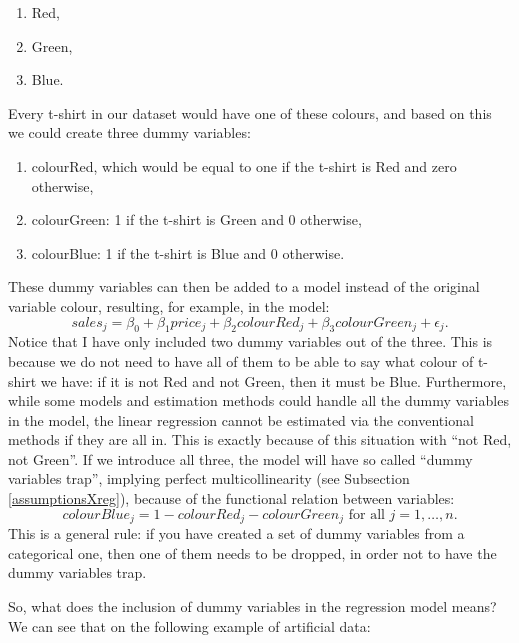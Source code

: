 \documentclass[
]{book}
\providecommand{\tightlist}{%
  \setlength{\itemsep}{0pt}\setlength{\parskip}{0pt}}
\theoremstyle{definition}
\theoremstyle{definition}
\theoremstyle{definition}
\theoremstyle{definition}
\theoremstyle{remark}
\begin{document}
\begin{enumerate}
\def\labelenumi{\arabic{enumi}.}
\tightlist
\item
  Red,
\item
  Green,
\item
  Blue.
\end{enumerate}

Every t-shirt in our dataset would have one of these colours, and based on this we could create three dummy variables:

\begin{enumerate}
\def\labelenumi{\arabic{enumi}.}
\tightlist
\item
  colourRed, which would be equal to one if the t-shirt is Red and zero otherwise,
\item
  colourGreen: 1 if the t-shirt is Green and 0 otherwise,
\item
  colourBlue: 1 if the t-shirt is Blue and 0 otherwise.
\end{enumerate}

These dummy variables can then be added to a model instead of the original variable colour, resulting, for example, in the model:
\begin{equation}
    sales_j = \beta_0 + \beta_1 price_j + \beta_2 colourRed_j + \beta_3 colourGreen_j + \epsilon_j .
    \label{eq:regressionDummies01}
\end{equation}
Notice that I have only included two dummy variables out of the three. This is because we do not need to have all of them to be able to say what colour of t-shirt we have: if it is not Red and not Green, then it must be Blue. Furthermore, while some models and estimation methods could handle all the dummy variables in the model, the linear regression cannot be estimated via the conventional methods if they are all in. This is exactly because of this situation with ``not Red, not Green''. If we introduce all three, the model will have so called ``dummy variables trap'', implying perfect multicollinearity (see Subsection \ref{assumptionsXreg}), because of the functional relation between variables:
\begin{equation}
    colourBlue_j = 1 - colourRed_j - colourGreen_j \text{ for all } j=1, \dots, n .
    \label{eq:regressionDummies02}
\end{equation}
This is a general rule: if you have created a set of dummy variables from a categorical one, then one of them needs to be dropped, in order not to have the dummy variables trap.

So, what does the inclusion of dummy variables in the regression model means? We can see that on the following example of artificial data:
\end{document}
